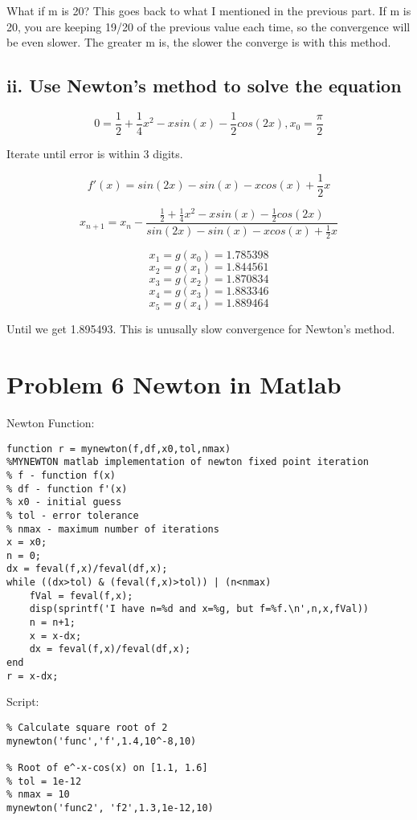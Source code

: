 \documentclass[]{article}
\begin{document}
What if m is 20? This goes back to what I mentioned in the previous
part. If m is 20, you are keeping 19/20 of the previous value each time,
so the convergence will be even slower. The greater m is, the slower the
converge is with this method.

\hypertarget{ii.-use-newtons-method-to-solve-the-equation}{%
\subsection{ii. Use Newton's method to solve the
equation}\label{ii.-use-newtons-method-to-solve-the-equation}}

\[0 = \frac12 + \frac14x^2 - xsin(x) - \frac12cos(2x), x_0 = \frac\pi2\]

Iterate until error is within 3 digits.

\[f'(x) = sin(2x)-sin(x)-xcos(x)+\frac12x\]

\[x_{n+1} = x_n-\frac{\frac12 + \frac14x^2 - xsin(x) - \frac12cos(2x)}{sin(2x)-sin(x)-xcos(x)+\frac12x}\]

\[x_1 = g(x_0) = 1.785398\] \[x_2 = g(x_1) = 1.844561\]
\[x_3 = g(x_2) = 1.870834\] \[x_4 = g(x_3) = 1.883346\]
\[x_5 = g(x_4) = 1.889464\]

Until we get 1.895493. This is unusally slow convergence for Newton's
method.

\hypertarget{problem-6-newton-in-matlab}{%
\section{Problem 6 Newton in Matlab}\label{problem-6-newton-in-matlab}}

Newton Function:

\begin{verbatim}
function r = mynewton(f,df,x0,tol,nmax)
%MYNEWTON matlab implementation of newton fixed point iteration
% f - function f(x)
% df - function f'(x)
% x0 - initial guess
% tol - error tolerance
% nmax - maximum number of iterations
x = x0;
n = 0;
dx = feval(f,x)/feval(df,x);
while ((dx>tol) & (feval(f,x)>tol)) | (n<nmax)
    fVal = feval(f,x);
    disp(sprintf('I have n=%d and x=%g, but f=%f.\n',n,x,fVal))
    n = n+1;
    x = x-dx;
    dx = feval(f,x)/feval(df,x);
end
r = x-dx;
\end{verbatim}

Script:

\begin{verbatim}
% Calculate square root of 2
mynewton('func','f',1.4,10^-8,10)

% Root of e^-x-cos(x) on [1.1, 1.6]
% tol = 1e-12
% nmax = 10
mynewton('func2', 'f2',1.3,1e-12,10)
\end{verbatim}
\end{document}
